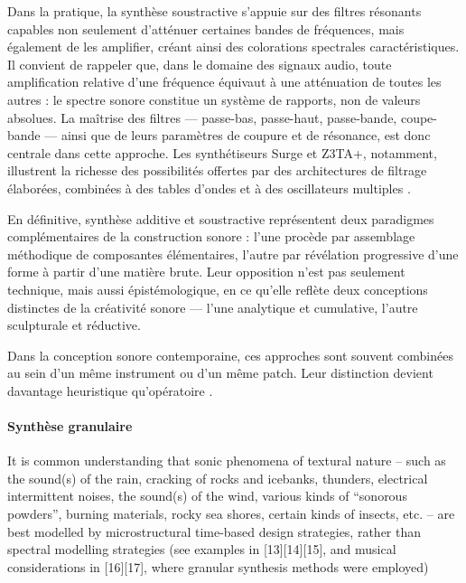 ﻿\documentclass[12pt]{article}
\begin{document}
Dans la pratique, la synthèse soustractive s'appuie sur des filtres résonants capables non seulement d'atténuer certaines bandes de fréquences, mais également de les amplifier, créant ainsi des colorations spectrales caractéristiques. Il convient de rappeler que, dans le domaine des signaux audio, toute amplification relative d'une fréquence équivaut à une atténuation de toutes les autres \parencite{farnell_designing_2010} : le spectre sonore constitue un système de rapports, non de valeurs absolues. La maîtrise des filtres --- passe-bas, passe-haut, passe-bande, coupe-bande --- ainsi que de leurs paramètres de coupure et de résonance, est donc centrale dans cette approche. Les synthétiseurs Surge et Z3TA+, notamment, illustrent la richesse des possibilités offertes par des architectures de filtrage élaborées, combinées à des tables d'ondes et à des oscillateurs multiples \parencite{cann_how_2007}.
 
En définitive, synthèse additive et soustractive représentent deux paradigmes complémentaires de la construction sonore : l'une procède par assemblage méthodique de composantes élémentaires, l'autre par révélation progressive d'une forme à partir d'une matière brute. Leur opposition n'est pas seulement technique, mais aussi épistémologique, en ce qu'elle reflète deux conceptions distinctes de la créativité sonore --- l'une analytique et cumulative, l'autre sculpturale et réductive. 

Dans la conception sonore contemporaine, ces approches sont souvent combinées au sein d'un même instrument ou d'un même patch. Leur distinction devient davantage heuristique qu'opératoire \parencite{farnell_designing_2010, cann_how_2007}.

\paragraph{Synthèse granulaire}

 It is common understanding that sonic phenomena of textural nature – such as the sound(s) of the rain, cracking of rocks and icebanks, thunders, electrical intermittent noises, the sound(s) of the wind, various kinds of “sonorous powders”, burning materials, rocky sea shores, certain kinds of insects, etc. – are best modelled by microstructural time-based design strategies, rather than spectral modelling strategies (see examples in [13][14][15], and musical considerations in [16][17], where granular synthesis methods were employed) \parencite{di_scipio_synthesis_1999}
\end{document}
